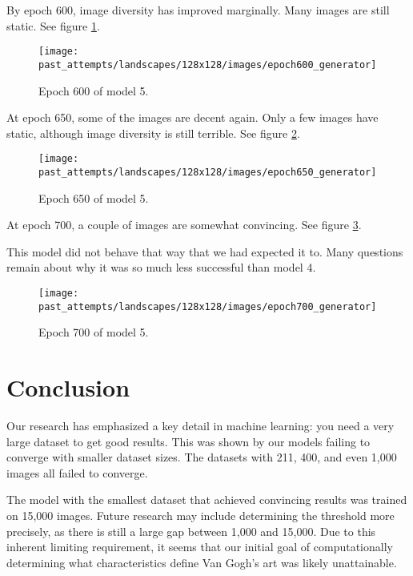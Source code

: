 \documentclass[11pt,letterpaper]{article}
\begin{document}
				By epoch 600, image diversity has improved marginally.
				Many images are still static.
				See figure \ref{fig:wa128:epoch600generator}.
				\begin{figure}
					\centering
					\texttt{[image: past\_attempts/landscapes/128x128/images/epoch600\_generator]}
					\caption{Epoch 600 of model 5.}
					\label{fig:wa128:epoch600generator}
				\end{figure}

				At epoch 650, some of the images are decent again.
				Only a few images have static, although image diversity is still terrible.
				See figure \ref{fig:wa128:epoch650generator}.
				\begin{figure}
					\centering
					\texttt{[image: past\_attempts/landscapes/128x128/images/epoch650\_generator]}
					\caption{Epoch 650 of model 5.}
					\label{fig:wa128:epoch650generator}
				\end{figure}

				At epoch 700, a couple of images are somewhat convincing.
				See figure \ref{fig:wa128:epoch700generator}.

				This model did not behave that way that we had expected it to.
				Many questions remain about why it was so much less successful than model 4.
				\begin{figure}
					\centering
					\texttt{[image: past\_attempts/landscapes/128x128/images/epoch700\_generator]}
					\caption{Epoch 700 of model 5.}
					\label{fig:wa128:epoch700generator}
				\end{figure}

	\section{Conclusion}
		Our research has emphasized a key detail in machine learning: you need a very large dataset to get good results.
		This was shown by our models failing to converge with smaller dataset sizes.
		The datasets with 211, 400, and even 1,000 images all failed to converge.


		The model with the smallest dataset that achieved convincing results was trained on 15,000 images.
		Future research may include determining the threshold more precisely, as there is still a large gap between 1,000 and 15,000.
		Due to this inherent limiting requirement, it seems that our initial goal of computationally determining what characteristics define Van Gogh's art was likely unattainable.
\end{document}
